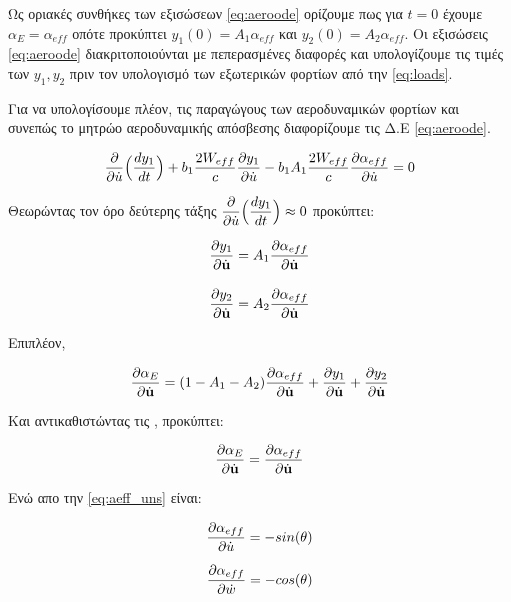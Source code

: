 \vspace{0.5cm}

Ως οριακές συνθήκες των εξισώσεων \ref{eq:aeroode} ορίζουμε πως για $t=0$ έχουμε $\alpha_{E}=\alpha_{eff}$ οπότε προκύπτει $y_1(0) = A_1\alpha_{eff}$ και $y_2(0) = A_2\alpha_{eff}$. Οι εξισώσεις \ref{eq:aeroode} διακριτοποιούνται με πεπερασμένες διαφορές και υπολογίζουμε τις τιμές των $y_1,y_2$ πριν τον υπολογισμό των εξωτερικών φορτίων από την \cref{eq:loads}.

Για να υπολογίσουμε πλέον, τις παραγώγους των αεροδυναμικών φορτίων και συνεπώς το μητρώο αεροδυναμικής απόσβεσης διαφορίζουμε τις Δ.Ε \ref{eq:aeroode}.

\begin{equation}
    \dfrac{\partial }{\partial \dot{u}}\Big(\dfrac{dy_1}{dt}\Big) + b_1\dfrac{2W_{eff}}{c}\dfrac{\partial y_1}{\partial \dot{u}}-b_1A_1\dfrac{2W_{eff}}{c}\dfrac{\partial \alpha_{eff}}{\partial \dot{u}} = 0
    \label{eq:diffOde}
\end{equation}

Θεωρώντας τον όρο δεύτερης τάξης $\dfrac{\partial }{\partial \dot{u}}\Big(\dfrac{dy_1}{dt}\Big) \approx 0$ προκύπτει:

\begin{align}
    \dfrac{\partial y_1}{\partial \dot{\mathbf{u}}}&=A_1\dfrac{\partial \alpha_{eff}}{\partial \dot{\mathbf{u}}}\label{eq:y1der}\\[10pt]
    \dfrac{\partial y_2}{\partial \dot{\mathbf{u}}}&=A_2\dfrac{\partial \alpha_{eff}}{\partial \dot{\mathbf{u}}}\label{eq:y2der}
\end{align}

Επιπλέον,

\begin{equation}
    \dfrac{\partial \alpha_E}{\partial \dot{\mathbf{u}}} = (1-A_1-A_2)\dfrac{\partial \alpha_{eff}}{\partial \dot{\mathbf{u}}} + \dfrac{\partial y_1}{\partial \dot{\mathbf{u}}} + \dfrac{\partial y_2}{\partial \dot{\mathbf{u}}}
    \label{eq:aeder}
\end{equation}

Και αντικαθιστώντας τις , προκύπτει:

\begin{equation}
    \dfrac{\partial \alpha_E}{\partial \dot{\mathbf{u}}} = \dfrac{\partial \alpha_{eff}}{\partial \dot{\mathbf{u}}}
\end{equation}

Ενώ απο την \cref{eq:aeff_uns} είναι:

\begin{equation}
    \begin{aligned}
        \dfrac{\partial \alpha_{eff}}{\partial \dot{u}} = -sin(\theta)\\[6pt]
        \dfrac{\partial \alpha_{eff}}{\partial \dot{w}} = -cos(\theta)
    \end{aligned}
\end{equation}

